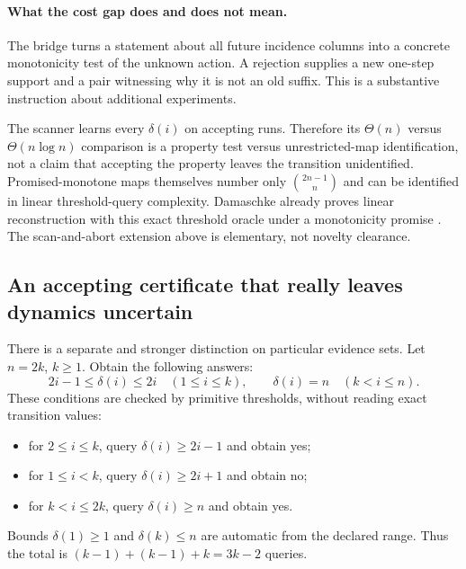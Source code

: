 \documentclass[11pt]{article}
\theoremstyle{remark}
\begin{document}
\paragraph{What the cost gap does and does not mean.}
The bridge turns a statement about all future incidence columns into a concrete monotonicity test of the unknown action. A rejection supplies a new one-step support and a pair witnessing why it is not an old suffix. This is a substantive instruction about additional experiments.

The scanner learns every $\delta(i)$ on accepting runs. Therefore its $\Theta(n)$ versus $\Theta(n\log n)$ comparison is a property test versus unrestricted-map identification, not a claim that accepting the property leaves the transition unidentified. Promised-monotone maps themselves number only $\binom{2n-1}{n}$ and can be identified in linear threshold-query complexity. Damaschke already proves linear reconstruction with this exact threshold oracle under a monotonicity promise \cite{Damaschke}. The scan-and-abort extension above is elementary, not novelty clearance.

\subsection{An accepting certificate that really leaves dynamics uncertain}
\label{sec:positivecertificate}

There is a separate and stronger distinction on particular evidence sets. Let $n=2k$, $k\ge1$. Obtain the following answers:
\[
 2i-1\le\delta(i)\le2i\quad(1\le i\le k),
 \qquad \delta(i)=n\quad(k<i\le n).
\]
These conditions are checked by primitive thresholds, without reading exact transition values:
\begin{itemize}
\item for $2\le i\le k$, query $\delta(i)\ge2i-1$ and obtain yes;
\item for $1\le i<k$, query $\delta(i)\ge2i+1$ and obtain no;
\item for $k<i\le2k$, query $\delta(i)\ge n$ and obtain yes.
\end{itemize}
Bounds $\delta(1)\ge1$ and $\delta(k)\le n$ are automatic from the declared range. Thus the total is $(k-1)+(k-1)+k=3k-2$ queries.
\end{document}
